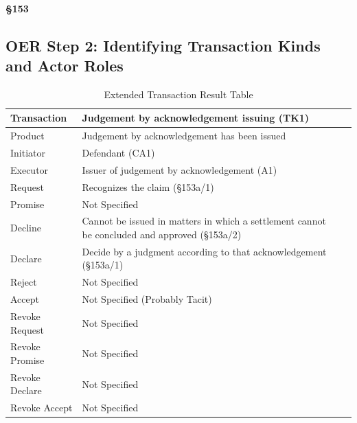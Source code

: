 \paragraph{\S 153}

\begin{landscape}
\section{OER Step 2: Identifying Transaction Kinds and Actor Roles}

\begin{table}[h]
\caption{Extended Transaction Result Table}
\label{tab:etrt}
\begin{tabular}{|l||l|l|}
\hline
Transaction  & Judgement by acknowledgement issuing (TK1) \\ \hline
Product      & Judgement by acknowledgement has been issued   \\ \hline
Initiator      & Defendant (CA1) \\ \hline
Executor       & Issuer of judgement by acknowledgement (A1)      \\ \hline
Request        & Recognizes the claim (\S153a/1)   \\ \hline
Promise        & Not Specified   \\ \hline
Decline        &  Cannot be issued in matters in which a settlement cannot be concluded and approved  (\S153a/2)  \\ \hline
Declare        & Decide by a judgment according to that acknowledgement (\S153a/1)  \\ \hline
Reject         &  Not Specified   \\ \hline
Accept         & Not Specified (Probably Tacit) \\ \hline
Revoke Request & Not Specified \\ \hline
Revoke Promise & Not Specified \\ \hline
Revoke Declare & Not Specified  \\ \hline
Revoke Accept  &  Not Specified   \\ \hline
\end{tabular}
\end{table}


\end{landscape}
